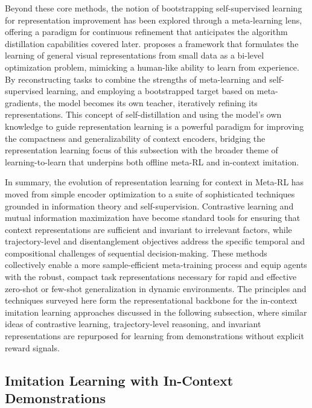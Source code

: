 \documentclass[11pt]{article}
\begin{document}
Beyond these core methods, the notion of bootstrapping self-supervised learning for representation improvement has been explored through a meta-learning lens, offering a paradigm for continuous refinement that anticipates the algorithm distillation capabilities covered later. \cite{ref346} proposes a framework that formulates the learning of general visual representations from small data as a bi-level optimization problem, mimicking a human-like ability to learn from experience. By reconstructing tasks to combine the strengths of meta-learning and self-supervised learning, and employing a bootstrapped target based on meta-gradients, the model becomes its own teacher, iteratively refining its representations. This concept of self-distillation and using the model's own knowledge to guide representation learning is a powerful paradigm for improving the compactness and generalizability of context encoders, bridging the representation learning focus of this subsection with the broader theme of learning-to-learn that underpins both offline meta-RL and in-context imitation.

In summary, the evolution of representation learning for context in Meta-RL has moved from simple encoder optimization to a suite of sophisticated techniques grounded in information theory and self-supervision. Contrastive learning and mutual information maximization have become standard tools for ensuring that context representations are sufficient and invariant to irrelevant factors, while trajectory-level and disentanglement objectives address the specific temporal and compositional challenges of sequential decision-making. These methods collectively enable a more sample-efficient meta-training process and equip agents with the robust, compact task representations necessary for rapid and effective zero-shot or few-shot generalization in dynamic environments. The principles and techniques surveyed here form the representational backbone for the in-context imitation learning approaches discussed in the following subsection, where similar ideas of contrastive learning, trajectory-level reasoning, and invariant representations are repurposed for learning from demonstrations without explicit reward signals.

\subsection{Imitation Learning with In-Context Demonstrations}
\end{document}
